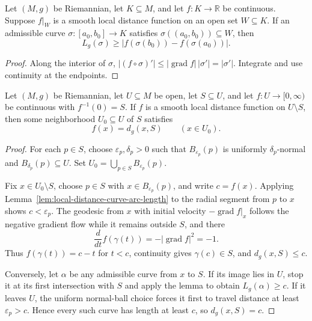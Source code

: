 \begin{lemma}
\label{lem:local-distance-curve-arc-length}

Let $(M,g)$ be Riemannian, let $K\subseteq M$, and let $f:K\to\mathbb R$ be
continuous. Suppose $f|_W$ is a smooth local distance function on an open set
$W\subseteq K$. If an admissible curve
$\sigma:[a_0,b_0]\to K$ satisfies
$\sigma((a_0,b_0))\subseteq W$, then
\[
L_g(\sigma)\geq|f(\sigma(b_0))-f(\sigma(a_0))|.
\]
\end{lemma}

\begin{proof}
\sketch Along the interior of $\sigma$,
$|(f\circ\sigma)'|\leq|\operatorname{grad}f|\,|\sigma'|=|\sigma'|$.
Integrate and use continuity at the endpoints.
\end{proof}

\begin{theorem}
\label{thm:smooth-local-distance-function}


Let $(M,g)$ be Riemannian, let $U\subseteq M$ be open, let $S\subseteq U$,
and let $f:U\to[0,\infty)$ be continuous with $f^{-1}(0)=S$. If $f$ is a
smooth local distance function on $U\setminus S$, then some neighborhood
$U_0\subseteq U$ of $S$ satisfies
\[
f(x)=d_g(x,S)
\qquad(x\in U_0).
\]
\end{theorem}

\begin{proof}
\sketch For each $p\in S$, choose $\varepsilon_p,\delta_p>0$ such that
$B_{\varepsilon_p}(p)$ is uniformly $\delta_p$-normal and
$B_{\delta_p}(p)\subseteq U$. Set
$U_0=\bigcup_{p\in S}B_{\varepsilon_p}(p)$.

Fix $x\in U_0\setminus S$, choose $p\in S$ with
$x\in B_{\varepsilon_p}(p)$, and write $c=f(x)$. Applying
Lemma~\ref{lem:local-distance-curve-arc-length} to the radial segment from
$p$ to $x$ shows $c<\varepsilon_p$. The geodesic from $x$ with initial
velocity $-\operatorname{grad}f|_x$ follows the negative gradient flow while
it remains outside $S$, and there
\[
\frac d{dt}f(\gamma(t))=-|\operatorname{grad}f|^2=-1.
\]
Thus $f(\gamma(t))=c-t$ for $t<c$, continuity gives
$\gamma(c)\in S$, and $d_g(x,S)\leq c$.

Conversely, let $\alpha$ be any admissible curve from $x$ to $S$. If its
image lies in $U$, stop it at its first intersection with $S$ and apply the
lemma to obtain $L_g(\alpha)\geq c$. If it leaves $U$, the uniform normal-ball
choice forces it first to travel distance at least $\varepsilon_p>c$. Hence
every such curve has length at least $c$, so $d_g(x,S)=c$.
\end{proof}

